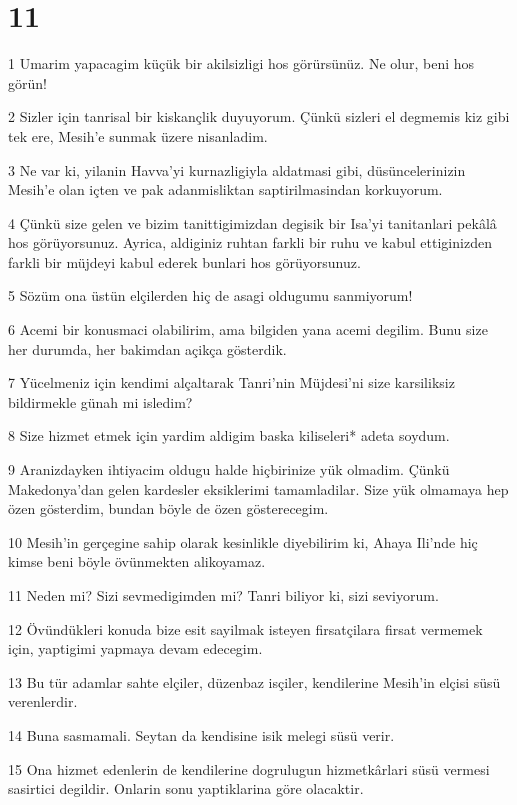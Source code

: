 \chapter{11}

\par 1 Umarim yapacagim küçük bir akilsizligi hos görürsünüz. Ne olur, beni hos görün!
\par 2 Sizler için tanrisal bir kiskançlik duyuyorum. Çünkü sizleri el degmemis kiz gibi tek ere, Mesih'e sunmak üzere nisanladim.
\par 3 Ne var ki, yilanin Havva'yi kurnazligiyla aldatmasi gibi, düsüncelerinizin Mesih'e olan içten ve pak adanmisliktan saptirilmasindan korkuyorum.
\par 4 Çünkü size gelen ve bizim tanittigimizdan degisik bir Isa'yi tanitanlari pekâlâ hos görüyorsunuz. Ayrica, aldiginiz ruhtan farkli bir ruhu ve kabul ettiginizden farkli bir müjdeyi kabul ederek bunlari hos görüyorsunuz.
\par 5 Sözüm ona üstün elçilerden hiç de asagi oldugumu sanmiyorum!
\par 6 Acemi bir konusmaci olabilirim, ama bilgiden yana acemi degilim. Bunu size her durumda, her bakimdan açikça gösterdik.
\par 7 Yücelmeniz için kendimi alçaltarak Tanri'nin Müjdesi'ni size karsiliksiz bildirmekle günah mi isledim?
\par 8 Size hizmet etmek için yardim aldigim baska kiliseleri* adeta soydum.
\par 9 Aranizdayken ihtiyacim oldugu halde hiçbirinize yük olmadim. Çünkü Makedonya'dan gelen kardesler eksiklerimi tamamladilar. Size yük olmamaya hep özen gösterdim, bundan böyle de özen gösterecegim.
\par 10 Mesih'in gerçegine sahip olarak kesinlikle diyebilirim ki, Ahaya Ili'nde hiç kimse beni böyle övünmekten alikoyamaz.
\par 11 Neden mi? Sizi sevmedigimden mi? Tanri biliyor ki, sizi seviyorum.
\par 12 Övündükleri konuda bize esit sayilmak isteyen firsatçilara firsat vermemek için, yaptigimi yapmaya devam edecegim.
\par 13 Bu tür adamlar sahte elçiler, düzenbaz isçiler, kendilerine Mesih'in elçisi süsü verenlerdir.
\par 14 Buna sasmamali. Seytan da kendisine isik melegi süsü verir.
\par 15 Ona hizmet edenlerin de kendilerine dogrulugun hizmetkârlari süsü vermesi sasirtici degildir. Onlarin sonu yaptiklarina göre olacaktir.
